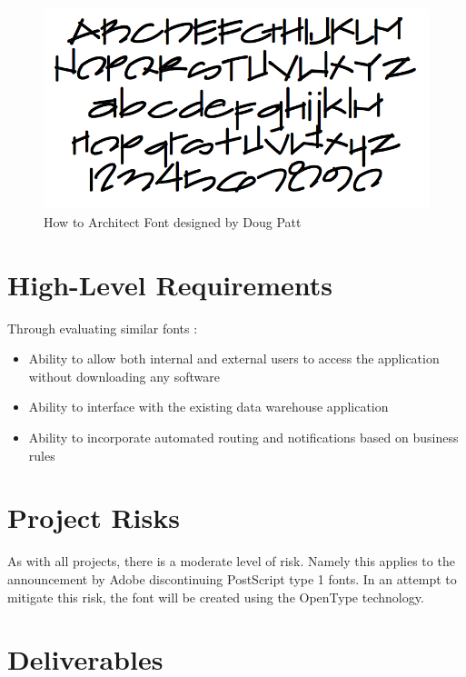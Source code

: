 \documentclass[a4paper]{article}
\begin{document}
    \begin{figure}[h]
            \includegraphics[width=1\textwidth]{ArchitectsFont.jpg}
            \caption{How to Architect Font designed by Doug Patt}
        \label{fig:architects}
    \end{figure}
\pagebreak 
\section{High-Level Requirements} %
Through evaluating similar fonts :
\begin{itemize}
    \item Ability to allow both internal and external users to access the application without downloading any software 
    \item Ability to interface with the existing data warehouse application 
    \item Ability to incorporate automated routing and notifications based on business rules
\end{itemize}

\section{Project Risks}
As with all projects, there is a moderate level of risk. Namely this applies to the announcement by Adobe discontinuing PostScript type 1 fonts. In an attempt to mitigate this risk, the font will be created using the OpenType technology. 
\section{Deliverables} %
\end{document}
